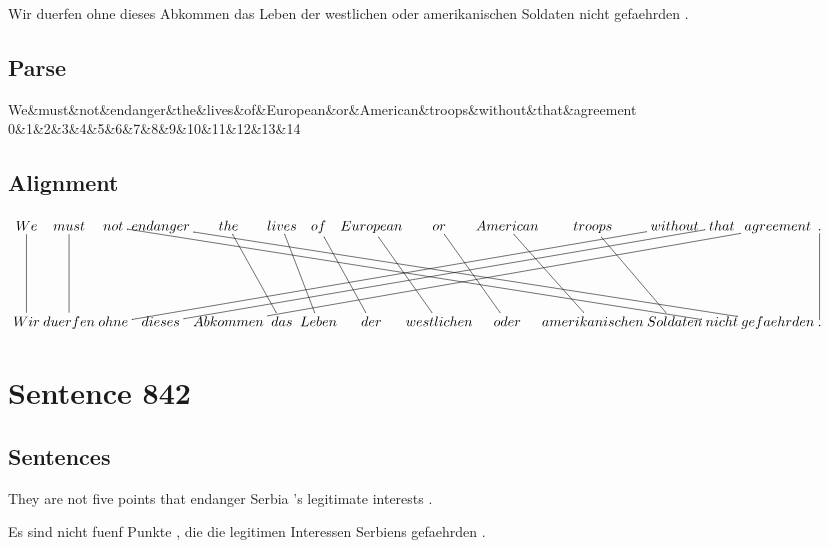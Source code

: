 \documentclass{report}
\begin{document}
\noindent Wir duerfen ohne dieses Abkommen das Leben der westlichen oder amerikanischen Soldaten nicht gefaehrden .



\subsection*{Parse}
\begin{dependency}[theme=simple]
\begin{deptext}[column sep=.5cm, row sep=.1ex]
We\&must\&not\&endanger\&the\&lives\&of\&European\&or\&American\&troops\&without\&that\&agreement\\
0\&1\&2\&3\&4\&5\&6\&7\&8\&9\&10\&11\&12\&13\&14\\
\end{deptext}
\end{dependency}


\subsection*{Alignment}
\scriptsize{
$
\xymatrix@C-2.3pc{
We \ar @{-} [dd] & must \ar @{-} [dd] & not \ar @{-} [ddrrrrrrrrrr] & endanger \ar @{-} [ddrrrrrrrrrr] & the \ar @{-} [ddr] & lives \ar @{-} [ddr] & of \ar @{-} [ddr] & European \ar @{-} [ddr] & or \ar @{-} [ddr] & American \ar @{-} [ddr] & troops \ar @{-} [ddr] & without \ar @{-} [ddlllllllll] & that \ar @{-} [ddlllllllll] & agreement \ar @{-} [ddlllllllll] & . \ar @{-} [dd]\\\\
Wir & duerfen & ohne & dieses & Abkommen & das & Leben & der & westlichen & oder & amerikanischen & Soldaten & nicht & gefaehrden & .
}$}
\newpage\section*{Sentence 842}

\subsection*{Sentences}
They are not five points that endanger Serbia 's legitimate interests .

\noindent Es sind nicht fuenf Punkte , die die legitimen Interessen Serbiens gefaehrden .
\end{document}
